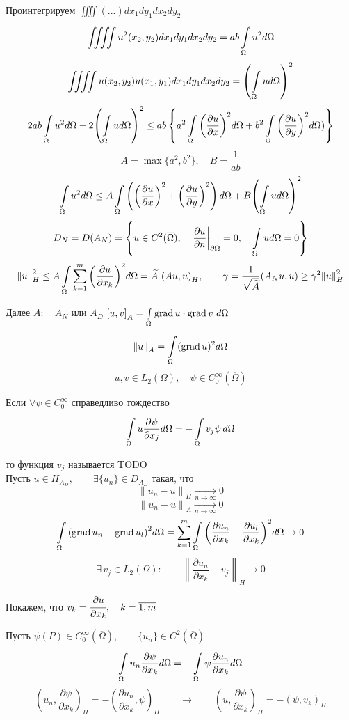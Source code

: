 Проинтегрируем $\iiiint (...) dx_1 dy_1 dx_2 dy_2$
\[ \iiiint u^2 (x_2, y_2) dx_1 dy_1 dx_2 dy_2 = ab \int\limits_{\Omega}^{} u^2 d\Omega \]
\[ \iiiint u(x_2, y_2) u(x_1, y_1) dx_1 dy_1 dx_2 dy_2 = {\left( \int\limits_{\Omega}^{} u d \Omega \right)}^2 \]
\[ 2 ab \int\limits_{\Omega}^{} u^2 d\Omega -2 {\left(\int\limits_{\Omega}^{} u d\Omega \right)}^2 \leq ab \left\{a^2 \int\limits_{\Omega}^{} {\left(\frac{\partial u}{\partial x}\right)}^2 d\Omega + b^2 \int\limits_{\Omega}^{} {\left(\frac{\partial u}{\partial y}\right)}^2 d\Omega) \right\} \]
\[ A = \max \{a^2, b^2\}, \quad B = \frac{1}{ab} \]
\[ \int\limits_{\Omega} u^2 d\Omega \leq A \int\limits_{\Omega} \left( {\left(\frac{\partial u }{\partial x}\right)}^2 + {\left(\frac{\partial u }{\partial y}\right)}^2 \right) d\Omega + B {\left(\int\limits_{\Omega} u d\Omega \right)}^2 \]
\[ D_N = D(A_N) = \left\{ u \in C^2(\overline{\Omega}), \quad {\left. \frac{\partial u}{\partial n} \right|}_{\partial  \Omega} = 0, \quad \int\limits_{\Omega}^{} u d\Omega = 0 \right\} \]
\[ {\|u\|}^2_H \leq A \int\limits_{\Omega}^{} \sum\limits_{k=1}^{m} {\left(\frac{\partial u}{\partial x_k}\right)}^2 d\Omega = \widetilde{A} \ {(Au, u)}_H, \qquad \gamma = \frac{1}{\sqrt{\widetilde{A}}} (A_Nu, u) \geq \gamma^2 {\|u\|}^2_H\]

Далее $ A: \quad A_N $ или $ A_D $ \qquad $ {[u, v]}_A = \int\limits_{\Omega}^{} \operatorname{grad} u \cdot \operatorname{grad} v \ d\Omega$ 
\[ {\|u\|}_A = \int\limits_{\Omega}^{} (\operatorname{grad} u )^2 d \Omega \]
\[ u, v \in L_2 (\Omega), \quad \psi \in C^{\infty}_0 (\overline{ \Omega}) \]

Если $\forall \psi \in C^{\infty}_0$ справедливо тождество
\[ \int\limits_{\Omega}^{} u \frac{\partial \psi}{\partial x_j} d\Omega = -\int\limits_{\Omega} v_j \psi \, d \Omega \]

то функция $v_j$ называется TODO \\

Пусть $u \in H_{A_D}, \qquad \exists \{u_n\} \in D_{A_{D}}$ такая, что
\[ {\|u_n - u\|}_H \underset{n \rightarrow \infty}{\rightarrow} 0 \]
\[ {\|u_n - u\|}_A \underset{n \rightarrow \infty}{\rightarrow} 0 \]
\[ \int\limits_{\Omega} {(\operatorname{grad} u_n - \operatorname{grad} u_l)}^2 d\Omega = \sum\limits_{k=1}^{m} \int\limits_{\Omega} {\left( \frac{\partial  u_n}{\partial  x_k} - \frac{\partial u_l}{\partial x_k} \right)}^2 d \Omega \rightarrow 0 \]
\[ \exists \, v_j \in L_2(\Omega): \qquad {\left\| \frac{\partial u_n}{\partial x_k} - v_j \right\|}_H \rightarrow 0 \]

Покажем, что $ v_k = \cfrac{\partial u}{\partial x_k}, \quad k=\overline{1,m} $

Пусть $ \psi(P) \in C^{\infty}_{0} ( \overline{\Omega}), \qquad \{u_n\} \in C^2(\overline{\Omega}) $
\[ \int\limits_{\Omega}^{} u_n \frac{\partial \psi}{\partial x_k} d\Omega = - \int\limits_{\Omega}^{} \psi \frac{\partial u_n}{\partial x_k} d\Omega \]
\[ {\left( u_n, \frac{\partial \psi}{\partial  x_k} \right)}_H = - {\left( \frac{\partial  u_n}{\partial x_k}, \psi \right)}_H \qquad \rightarrow \qquad {\left( u, \frac{\partial \psi}{\partial  x_k} \right)}_H = -(\psi, v_k)_H \]

